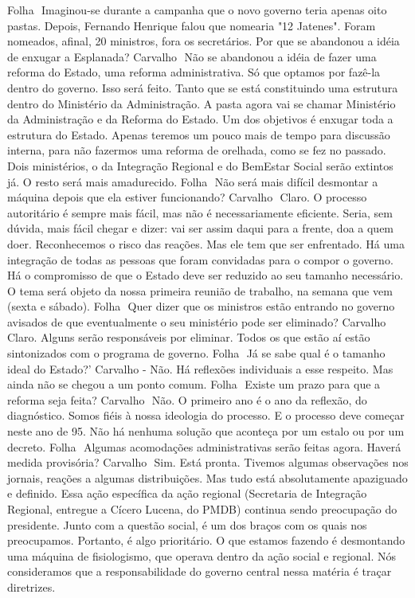 Folha  Imaginou-se durante a campanha que o novo governo teria apenas oito pastas. Depois, Fernando Henrique falou que nomearia "12 Jatenes". Foram nomeados, afinal, 20 ministros, fora os secretários. Por que se abandonou a idéia de enxugar a Esplanada?
Carvalho  Não se abandonou a idéia de fazer uma reforma do Estado, uma reforma administrativa. Só que optamos por fazê-la dentro do governo. Isso será feito. Tanto que se está constituindo uma estrutura dentro do Ministério da Administração. A pasta agora vai se chamar Ministério da Administração e da Reforma do Estado. Um dos objetivos é enxugar toda a estrutura do Estado. Apenas teremos um pouco mais de tempo para discussão interna, para não fazermos uma reforma de orelhada, como se fez no passado. Dois ministérios, o da Integração Regional e do BemEstar Social serão extintos já. O resto será mais amadurecido.
Folha  Não será mais difícil desmontar a máquina depois que ela estiver funcionando?
Carvalho  Claro. O processo autoritário é sempre mais fácil, mas não é necessariamente eficiente. Seria, sem dúvida, mais fácil chegar e dizer: vai ser assim daqui para a frente, doa a quem doer. Reconhecemos o risco das reações. Mas ele tem que ser enfrentado. Há uma integração de todas as pessoas que foram convidadas para o compor o governo. Há o compromisso de que o Estado deve ser reduzido ao seu tamanho necessário. O tema será objeto da nossa primeira reunião de trabalho, na semana que vem (sexta e sábado).
Folha  Quer dizer que os ministros estão entrando no governo avisados de que eventualmente o seu ministério pode ser eliminado?
Carvalho  Claro. Alguns serão responsáveis por eliminar. Todos os que estão aí estão sintonizados com o programa de governo.
Folha  Já se sabe qual é o tamanho ideal do Estado?'
Carvalho - Não. Há reflexões individuais a esse respeito. Mas ainda não se chegou a um ponto comum.
Folha  Existe um prazo para que a reforma seja feita?
Carvalho  Não. O primeiro ano é o ano da reflexão, do diagnóstico. Somos fiéis à nossa ideologia do processo. E o processo deve começar neste ano de 95. Não há nenhuma solução que aconteça por um estalo ou por um decreto.
Folha  Algumas acomodações administrativas serão feitas agora. Haverá medida provisória?
Carvalho  Sim. Está pronta. Tivemos algumas observações nos jornais, reações a algumas distribuições. Mas tudo está absolutamente apaziguado e definido. Essa ação específica da ação regional (Secretaria de Integração Regional, entregue a Cícero Lucena, do PMDB) continua sendo preocupação do presidente.
Junto com a questão social, é um dos braços com os quais nos preocupamos. Portanto, é algo prioritário. O que estamos fazendo é desmontando uma máquina de fisiologismo, que operava dentro da ação social e regional. Nós consideramos que a responsabilidade do governo central nessa matéria é traçar diretrizes.
